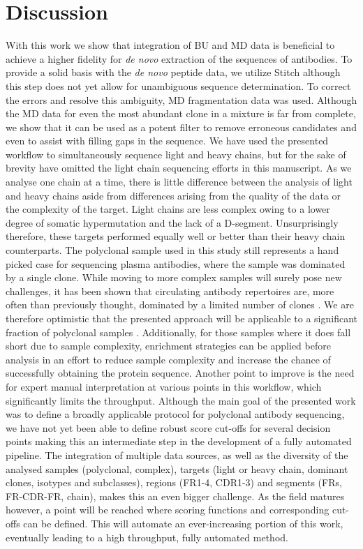 \section{Discussion}
With this work we show that integration of BU and MD data is beneficial to achieve a higher fidelity for \emph{de novo} extraction of the sequences of antibodies. To provide a solid basis with the \emph{de novo} peptide data, we utilize Stitch \cite{schulte2022template-based} although this step does not yet allow for unambiguous sequence determination. To correct the errors and resolve this ambiguity, MD fragmentation data was used. Although the MD data for even the most abundant clone in a mixture is far from complete, we show that it can be used as a potent filter to remove erroneous candidates and even to assist with filling gaps in the sequence. We have used the presented workflow to simultaneously sequence light and heavy chains, but for the sake of brevity have omitted the light chain sequencing efforts in this manuscript. As we analyse one chain at a time, there is little difference between the analysis of light and heavy chains aside from differences arising from the quality of the data or the complexity of the target. Light chains are less complex owing to a lower degree of somatic hypermutation and the lack of a D-segment. Unsurprisingly therefore, these targets performed equally well or better than their heavy chain counterparts.
The polyclonal sample used in this study still represents a hand picked case for sequencing plasma antibodies, where the sample was dominated by a single clone. While moving to more complex samples will surely pose new challenges, it has been shown that circulating antibody repertoires are, more often than previously thought, dominated by a limited number of clones \cite{bondt2021human, bondt2021direct}. We are therefore optimistic that the presented approach will be applicable to a significant fraction of polyclonal samples . Additionally, for those samples where it does fall short due to sample complexity, enrichment strategies can be applied before analysis in an effort to reduce sample complexity and increase the chance of successfully obtaining the protein sequence. Another point to improve is the need for expert manual interpretation at various points in this workflow, which significantly limits the throughput. Although the main goal of the presented work was to define a broadly applicable protocol for polyclonal antibody sequencing, we have not yet been able to define robust score cut-offs for several decision points making this an intermediate step in the development of a fully automated pipeline. The integration of multiple data sources, as well as the diversity of the analysed samples (polyclonal, complex), targets (light or heavy chain, dominant clones, isotypes and subclasses), regions (FR1-4, CDR1-3) and segments (FRs, FR-CDR-FR, chain), makes this an even bigger challenge. As the field matures however, a point will be reached where scoring functions and corresponding cut-offs can be defined. This will automate an ever-increasing portion of this work, eventually leading to a high throughput, fully automated method.


